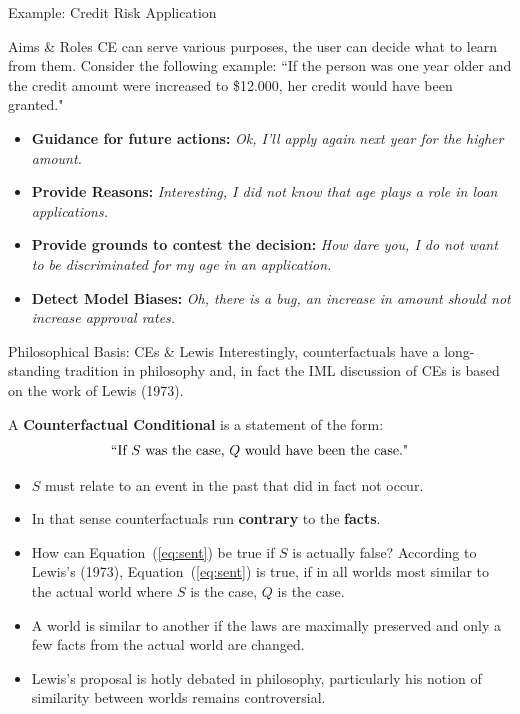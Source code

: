 \documentclass[11pt,compress,t,notes=noshow, xcolor=table]{beamer}
\begin{document}
\begin{vbframe}{Example: Credit Risk Application}
\end{vbframe}



\begin{vbframe}{Aims \& Roles}
	CE can serve various purposes, the user can decide what to learn from them. Consider the following example:\newline
	``If the person was one year older and the credit amount were increased to \$12.000, her credit would have been granted."  \\[0.2cm]
	\begin{itemize}
		\itemsep1.3em
		\item \textbf{Guidance for future actions:} \textit{Ok, I'll apply again next year for the higher amount.}
		\item \textbf{Provide Reasons:} \textit{Interesting, I did not know that age plays a role in loan applications.}
		\item \textbf{Provide grounds to contest the decision:} \textit{How dare you, I do not want to be discriminated for my age in an application.}
		\item \textbf{Detect Model Biases:} \textit{Oh, there is a bug, an increase in amount should not increase approval rates.}
	\end{itemize}
\end{vbframe}

\begin{vbframe}{Philosophical Basis: CEs \& Lewis}
Interestingly, counterfactuals have a long-standing tradition in philosophy and, in fact the IML discussion of CEs is based on the work of Lewis (1973). 

A \textbf{Counterfactual Conditional} is a statement of the form:	
\begin{equation}
		\textnormal{``If $S$ was the case, $Q$ would have been the case."}
		\label{eq:sent}
\end{equation}
	\begin{itemize}
		\item $S$ must relate to an event in the past that did in fact not occur.
		\item In that sense counterfactuals run \textbf{contrary} to the \textbf{facts}.
		\item How can Equation~(\ref{eq:sent}) be true if $S$ is actually false? According to Lewis's (1973), Equation~(\ref{eq:sent}) is true, if in all worlds most similar to the actual world where $S$ is the case, $Q$ is the case. 
		\item A world is similar to another if the laws are maximally preserved and only a few facts from the actual world are changed.
		\item Lewis's proposal is hotly debated in philosophy, particularly his notion of similarity between worlds remains controversial. 
	\end{itemize}
\end{vbframe}
\end{document}
